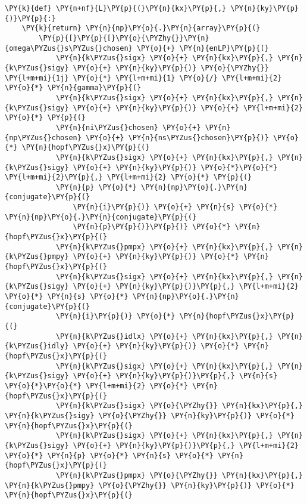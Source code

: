 \begin{Verbatim}[commandchars=\\\{\}]
\PY{k}{def} \PY{n+nf}{L}\PY{p}{(}\PY{n}{kx}\PY{p}{,} \PY{n}{ky}\PY{p}{)}\PY{p}{:}
    \PY{k}{return} \PY{n}{np}\PY{o}{.}\PY{n}{array}\PY{p}{(}
        \PY{p}{[}\PY{p}{[}\PY{o}{\PYZhy{}}\PY{n}{omega\PYZus{}s\PYZus{}chosen} \PY{o}{+} \PY{n}{enLP}\PY{p}{(}
            \PY{n}{k\PYZus{}sigx} \PY{o}{+} \PY{n}{kx}\PY{p}{,} \PY{n}{k\PYZus{}sigy} \PY{o}{+} \PY{n}{ky}\PY{p}{)} \PY{o}{\PYZhy{}} \PY{l+m+mi}{1j} \PY{o}{*} \PY{l+m+mi}{1} \PY{o}{/} \PY{l+m+mi}{2} \PY{o}{*} \PY{n}{gamma}\PY{p}{(}
            \PY{n}{k\PYZus{}sigx} \PY{o}{+} \PY{n}{kx}\PY{p}{,} \PY{n}{k\PYZus{}sigy} \PY{o}{+} \PY{n}{ky}\PY{p}{)} \PY{o}{+} \PY{l+m+mi}{2} \PY{o}{*} \PY{p}{(}
            \PY{n}{ni\PYZus{}chosen} \PY{o}{+} \PY{n}{np\PYZus{}chosen} \PY{o}{+} \PY{n}{ns\PYZus{}chosen}\PY{p}{)} \PY{o}{*} \PY{n}{hopf\PYZus{}x}\PY{p}{(}
            \PY{n}{k\PYZus{}sigx} \PY{o}{+} \PY{n}{kx}\PY{p}{,} \PY{n}{k\PYZus{}sigy} \PY{o}{+} \PY{n}{ky}\PY{p}{)} \PY{o}{*}\PY{o}{*} \PY{l+m+mi}{2}\PY{p}{,} \PY{l+m+mi}{2} \PY{o}{*} \PY{p}{(}
            \PY{n}{p} \PY{o}{*} \PY{n}{np}\PY{o}{.}\PY{n}{conjugate}\PY{p}{(}
                \PY{n}{i}\PY{p}{)} \PY{o}{+} \PY{n}{s} \PY{o}{*} \PY{n}{np}\PY{o}{.}\PY{n}{conjugate}\PY{p}{(}
                \PY{n}{p}\PY{p}{)}\PY{p}{)} \PY{o}{*} \PY{n}{hopf\PYZus{}x}\PY{p}{(}
            \PY{n}{k\PYZus{}pmpx} \PY{o}{+} \PY{n}{kx}\PY{p}{,} \PY{n}{k\PYZus{}pmpy} \PY{o}{+} \PY{n}{ky}\PY{p}{)} \PY{o}{*} \PY{n}{hopf\PYZus{}x}\PY{p}{(}
            \PY{n}{k\PYZus{}sigx} \PY{o}{+} \PY{n}{kx}\PY{p}{,} \PY{n}{k\PYZus{}sigy} \PY{o}{+} \PY{n}{ky}\PY{p}{)}\PY{p}{,} \PY{l+m+mi}{2} \PY{o}{*} \PY{n}{s} \PY{o}{*} \PY{n}{np}\PY{o}{.}\PY{n}{conjugate}\PY{p}{(}
            \PY{n}{i}\PY{p}{)} \PY{o}{*} \PY{n}{hopf\PYZus{}x}\PY{p}{(}
            \PY{n}{k\PYZus{}idlx} \PY{o}{+} \PY{n}{kx}\PY{p}{,} \PY{n}{k\PYZus{}idly} \PY{o}{+} \PY{n}{ky}\PY{p}{)} \PY{o}{*} \PY{n}{hopf\PYZus{}x}\PY{p}{(}
            \PY{n}{k\PYZus{}sigx} \PY{o}{+} \PY{n}{kx}\PY{p}{,} \PY{n}{k\PYZus{}sigy} \PY{o}{+} \PY{n}{ky}\PY{p}{)}\PY{p}{,} \PY{n}{s} \PY{o}{*}\PY{o}{*} \PY{l+m+mi}{2} \PY{o}{*} \PY{n}{hopf\PYZus{}x}\PY{p}{(}
            \PY{n}{k\PYZus{}sigx} \PY{o}{\PYZhy{}} \PY{n}{kx}\PY{p}{,} \PY{n}{k\PYZus{}sigy} \PY{o}{\PYZhy{}} \PY{n}{ky}\PY{p}{)} \PY{o}{*} \PY{n}{hopf\PYZus{}x}\PY{p}{(}
            \PY{n}{k\PYZus{}sigx} \PY{o}{+} \PY{n}{kx}\PY{p}{,} \PY{n}{k\PYZus{}sigy} \PY{o}{+} \PY{n}{ky}\PY{p}{)}\PY{p}{,} \PY{l+m+mi}{2} \PY{o}{*} \PY{n}{p} \PY{o}{*} \PY{n}{s} \PY{o}{*} \PY{n}{hopf\PYZus{}x}\PY{p}{(}
            \PY{n}{k\PYZus{}pmpx} \PY{o}{\PYZhy{}} \PY{n}{kx}\PY{p}{,} \PY{n}{k\PYZus{}pmpy} \PY{o}{\PYZhy{}} \PY{n}{ky}\PY{p}{)} \PY{o}{*} \PY{n}{hopf\PYZus{}x}\PY{p}{(}

\end{Verbatim}
